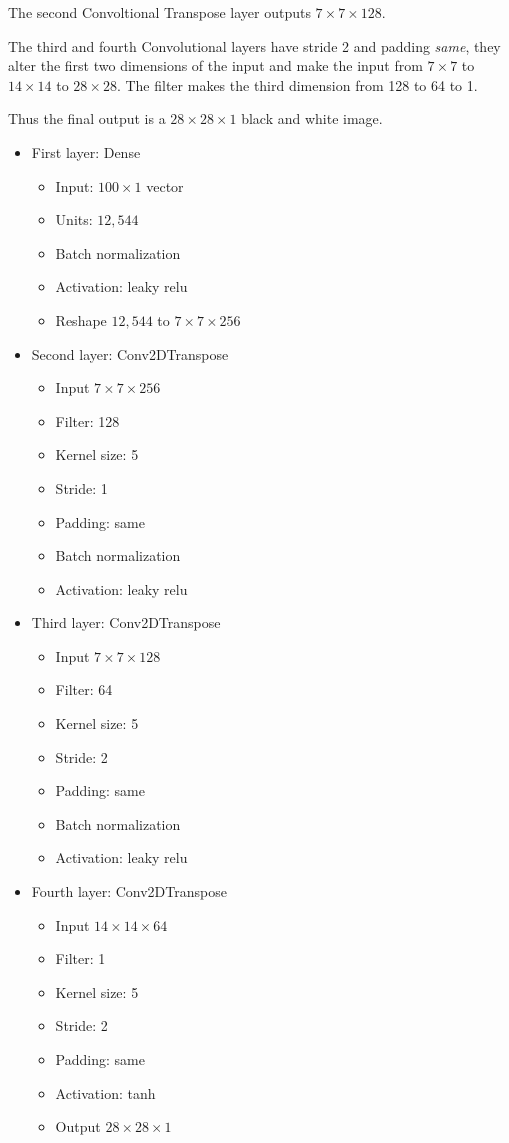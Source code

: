\documentclass{article}
\begin{document}
The second Convoltional Transpose layer outputs $7\times 7\times 128$.

The third and fourth Convolutional layers have stride 2 and padding \textit{same}, they alter the first two dimensions of the input and make the input from $7\times 7$ to $14\times 14$ to $28\times 28$.
The filter makes the third dimension from 128 to 64 to 1.

Thus the final output is a $28\times 28\times 1$ black and white image.

\begin{itemize}
  \item First layer: Dense
    \begin{itemize}
      \item Input: $100 \times 1$ vector
      \item Units: $12,544$
      \item Batch normalization
      \item Activation: leaky relu
      \item Reshape $12,544$ to $7\times 7\times 256$
    \end{itemize}
  \item Second layer: Conv2DTranspose
    \begin{itemize}
      \item Input $7\times 7\times 256$
      \item Filter: 128
      \item Kernel size: 5
      \item Stride: 1
      \item Padding: same
      \item Batch normalization
      \item Activation: leaky relu
  \end{itemize} 
  \item Third layer: Conv2DTranspose
    \begin{itemize}
      \item Input $7\times 7\times 128$
      \item Filter: 64
      \item Kernel size: 5
      \item Stride: 2
      \item Padding: same
      \item Batch normalization
      \item Activation: leaky relu
    \end{itemize}   
  \item Fourth layer: Conv2DTranspose
    \begin{itemize}
      \item Input $14\times 14\times 64$
      \item Filter: 1
      \item Kernel size: 5
      \item Stride: 2
      \item Padding: same
      \item Activation: tanh
      \item Output $28\times 28\times 1$
    \end{itemize}   
\end{itemize}
\end{document}
